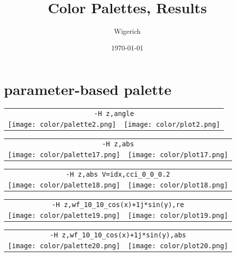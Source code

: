 \documentclass{article}
\title{
\vskip 8cm
\Huge{Color}
\vskip 1cm
Palettes, Results
\vskip 2cm
}
\author{Wigerich}
\date{\today}
\begin{document}
\maketitle

\newpage
\section{parameter-based palette}
\begin{center}
\begin{tabular}{m{8cm}m{8cm}}
\multicolumn{2}{c}{\tt -H z,angle} \\
\texttt{[image: color/palette2.png]} &
\texttt{[image: color/plot2.png]}
\end{tabular}
\end{center}

\begin{center}
\begin{tabular}{m{8cm}m{8cm}}
\multicolumn{2}{c}{\tt -H z,abs} \\
\texttt{[image: color/palette17.png]} &
\texttt{[image: color/plot17.png]}
\end{tabular}
\end{center}

\begin{center}
\begin{tabular}{m{8cm}m{8cm}}
\multicolumn{2}{c}{\tt -H z,abs V=idx,cci\_0\_0\_0.2} \\
\texttt{[image: color/palette18.png]} &
\texttt{[image: color/plot18.png]}
\end{tabular}
\end{center}

\begin{center}
\begin{tabular}{m{8cm}m{8cm}}
\multicolumn{2}{c}{\tt -H z,wf\_10\_10\_cos(x)+1j*sin(y),re} \\
\texttt{[image: color/palette19.png]} &
\texttt{[image: color/plot19.png]}
\end{tabular}
\end{center}

\begin{center}
\begin{tabular}{m{8cm}m{8cm}}
\multicolumn{2}{c}{\tt -H z,wf\_10\_10\_cos(x)+1j*sin(y),abs} \\
\texttt{[image: color/palette20.png]} &
\texttt{[image: color/plot20.png]}
\end{tabular}
\end{center}
\end{document}
